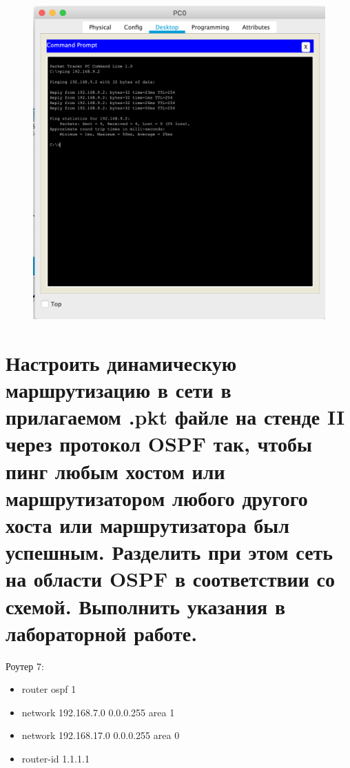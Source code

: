 \documentclass[a4paper,12pt]{article}
\begin{document}
	\begin{figure}[h!]
		\begin{center}
			{\includegraphics[scale = 0.45]{img/4.png}}
			\caption{}
			\label{ris:4}
		\end{center}
	\end{figure}

	\section{Настроить динамическую маршрутизацию в сети в прилагаемом .pkt файле на стенде II через протокол OSPF так, чтобы пинг любым хостом или маршрутизатором любого другого хоста или маршрутизатора был успешным. Разделить при этом сеть на области OSPF в соответствии со схемой. Выполнить указания в лабораторной работе.}
	
	Роутер 7:
	
	\begin{itemize}
		\item router ospf 1
		\item network 192.168.7.0 0.0.0.255 area 1
		\item network 192.168.17.0 0.0.0.255 area 0
		\item router-id 1.1.1.1
	\end{itemize}
\end{document}
